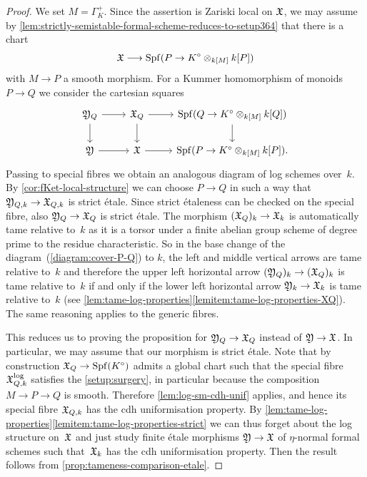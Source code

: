 \begin{proof}
We set $M = \Gamma_K^+$. 
Since the assertion is Zariski local on ${\mathfrak{X}}$, we may assume by \cref{lem:strictly-semistable-formal-scheme-reduces-to-setup364} that there is a chart
\[
    {\mathfrak{X}} \longrightarrow \operatorname{Spf}(P \to K^\circ \otimes_{k[M]}k[P])
\]
with $M \to P$ a smooth morphism. 
For a Kummer homomorphism of monoids $P \to Q$ we consider the cartesian squares
\begin{equation} \label{diagram:cover-P-Q}
 \begin{tikzcd}
     \fY_Q    \ar[r]  \ar[d]  
     & \fX_Q   \ar[r]  \ar[d]  &
     \Spf(Q \to K^\circ \otimes_{k[M]}k[Q])  \ar[d]  \\
     \fY      \ar[r]          
     & \fX     \ar[r]       &    \Spf(P \to K^\circ \otimes_{k[M]}k[P]).
 \end{tikzcd}
\end{equation}
Passing to special fibres we obtain an analogous diagram of log schemes over~$k$.
By \cref{cor:fKet-local-structure} we can choose $P \to Q$ in such a way that ${\mathfrak{Y}}_{Q,k} \to {\mathfrak{X}}_{Q,k}$ is strict étale.
Since strict étaleness can be checked on the special fibre, also ${\mathfrak{Y}}_Q \to {\mathfrak{X}}_Q$ is strict étale.
The morphism $({\mathfrak{X}}_Q)_k \to {\mathfrak{X}}_k$ is automatically tame relative to~$k$ as it is a torsor under a finite abelian group scheme of degree prime to the residue characteristic. 
So in the base change of the diagram~(\ref{diagram:cover-P-Q}) to $k$, the left and middle vertical arrows are tame relative to~$k$ and therefore the upper left horizontal arrow $({\mathfrak{Y}}_Q)_k \to ({\mathfrak{X}}_Q)_k$ is tame relative to~$k$ if and only if the lower left horizontal arrow ${\mathfrak{Y}}_k \to {\mathfrak{X}}_k$ is tame relative to~$k$ (see \cref{lem:tame-log-properties}\ref{lemitem:tame-log-properties-XQ}). The same reasoning applies to the generic fibres.

This reduces us to proving the proposition for ${\mathfrak{Y}}_Q \to {\mathfrak{X}}_Q$ instead of ${\mathfrak{Y}} \to {\mathfrak{X}}$.
In particular, we may assume that our morphism is strict étale.
Note that by construction ${\mathfrak{X}}_Q\to \operatorname{Spf}(K^\circ)$ admits a global chart such that the special fibre ${\mathfrak{X}}_{Q,k}^{\log}$ satisfies the \cref{setup:surgery}, in particular because the composition $M \to P \to Q$ is smooth. Therefore \cref{lem:log-sm-cdh-unif} applies, and hence its special fibre ${\mathfrak{X}}_{Q,k}$ has the cdh uniformisation property. 
By \cref{lem:tame-log-properties}\ref{lemitem:tame-log-properties-strict} we can thus forget about the log structure on~${\mathfrak{X}}$ and just study finite étale morphisms ${\mathfrak{Y}} \to {\mathfrak{X}}$ of $\eta$-normal formal schemes such that~${\mathfrak{X}}_k$ has the cdh uniformisation property.
Then the result follows from \cref{prop:tameness-comparison-etale}.
\end{proof}

